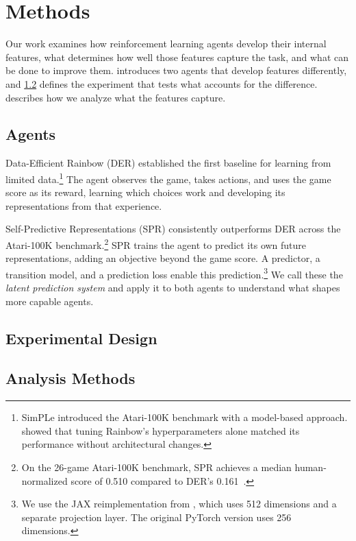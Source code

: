 \chapter{Methods}
\label{ch:methods}

Our work examines how reinforcement learning agents develop their
internal features, what determines how well those features capture
the task, and what can be done to improve them. 
introduces two agents that develop features differently, and
\cref{sec:experimental-design} defines the experiment that tests
what accounts for the difference. 
describes how we analyze what the features capture.

\section{Agents}
\label{sec:agents}

Data-Efficient Rainbow (DER) \citep{vanHasselt2019} established the
first baseline for learning from limited
data.\footnote{SimPLe \citep{kaiser2020model} introduced the
Atari-100K benchmark with a model-based approach.
\citet{vanHasselt2019} showed that tuning Rainbow's hyperparameters
alone matched its performance without architectural changes.}
The agent observes the game, takes actions, and uses the game score
as its reward, learning which choices work and developing its
representations from that experience.

\smallskip
Self-Predictive Representations (SPR) \citep{schwarzer2021dataefficient}
consistently outperforms DER across the Atari-100K
benchmark.\footnote{On the 26-game Atari-100K benchmark, SPR achieves
a median human-normalized score of 0.510 compared to DER's
0.161~\citep{schwarzer2021dataefficient}.}
SPR trains the agent to predict its own future representations,
adding an objective beyond the game score. A predictor, a transition
model, and a prediction loss enable this
prediction.\footnote{We use the JAX reimplementation from
\citet{nikishin2022primacy}, which uses 512 dimensions and a separate
projection layer. The original PyTorch version uses 256 dimensions.}
We call these the \emph{latent prediction system} and apply it to
both agents to understand what shapes more capable agents.

\section{Experimental Design}
\label{sec:experimental-design}

\vspace{2em}

\section{Analysis Methods}
\label{sec:analysis-methods}

\vspace{2em}
